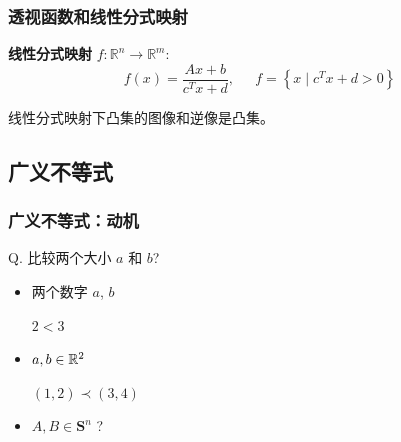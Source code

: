 \documentclass[handout]{beamer}
\begin{document}
\begin{frame}
	\frametitle{透视函数和线性分式映射}


\textbf{线性分式映射} $f: \mathbb{R}^{n} \rightarrow \mathbb{R}^{m}:$
\begin{equation}
	f(x)=\frac{A x+b}{c^{T} x+d}, \quad \ \ f=\left\{x \mid c^{T} x+d>0\right\}
\end{equation}

线性分式映射下凸集的图像和逆像是凸集。

\end{frame}

\subsection{广义不等式}

\begin{frame}
\frametitle{广义不等式：动机}

Q. 比较两个大小 $a$ 和 $b$? 
\begin{itemize}
  \item 两个数字 $a$, $b$ 
  
     $2<3 $ 
  
  \item  $a,b\in \mathbb{R}^2$ 
  
    $(1,2)\prec (3,4)$ 
  
  \item $A,B \in \mathbf{S}_{}^{n}$ ? 
  
\end{itemize}


\end{frame}
\end{document}
